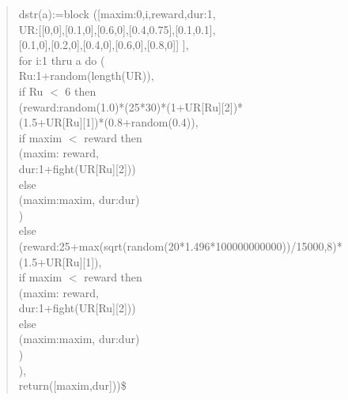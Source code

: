 \documentclass[]{article}
\begin{document}
\begin{quote}
dstr(a):=block ([maxim:0,i,reward,dur:1,\\
\hspace*{20mm}UR:[[0,0],[0.1,0],[0.6,0],[0.4,0.75],[0.1,0.1],\\
\hspace*{30mm}[0.1,0],[0.2,0],[0.4,0],[0.6,0],[0.8,0]] ],\\
\hspace*{10mm}for i:1 thru a do (\\
\hspace*{20mm}Ru:1+random(length(UR)),\\
\hspace*{20mm}if Ru $<$ 6 then\\
\hspace*{30mm}(reward:random(1.0)*(25*30)*(1+UR[Ru][2])*\\
\hspace*{40mm}(1.5+UR[Ru][1])*(0.8+random(0.4)),\\
\hspace*{30mm}if maxim $<$ reward then\\
\hspace*{40mm}(maxim: reward,\\
\hspace*{50mm}dur:1+fight(UR[Ru][2]))\\
\hspace*{30mm}else\\
\hspace*{40mm}(maxim:maxim, dur:dur)\\
\hspace*{30mm})\\
\hspace*{20mm}else\\
\hspace*{30mm}(reward:25+max(sqrt(random(20*1.496*100000000000))/15000,8)*\\
\hspace*{40mm}(1.5+UR[Ru][1]),\\
\hspace*{30mm}if maxim $<$ reward then\\
\hspace*{40mm}(maxim: reward,\\
\hspace*{40mm}dur:1+fight(UR[Ru][2]))\\
\hspace*{30mm}else\\
\hspace*{40mm}(maxim:maxim, dur:dur)\\
\hspace*{30mm})\\
\hspace*{20mm}),\\
\hspace*{10mm}return([maxim,dur]))\$\\


\end{quote}
\end{document}
